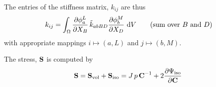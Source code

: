 The entries of the stiffness matrix, $k_{ij}$ are thus
\begin{equation*}
  \begin{array}{lll}
    k_{ij} = \ds\int_\Omega \p{\phi_a^L}{X_B}\tilde{k}_{abBD}\p{\phi_b^M}{X_D}\,\d V \qquad \text{(sum over $B$ and $D$)}
  \end{array}
\end{equation*}
with appropriate mappings $i \mapsto (a,L)$ and $j \mapsto (b,M)$.

The stress, $\textbf{S}$ is computed by
\begin{equation*}
  \begin{array}{lll}
    \bfS = \bfS_\text{vol} + \bfS_\text{iso} = J\,p\,\bfC^{-1} + 2\p{\Psi_\text{iso}}{\bfC}
  \end{array}
\end{equation*}

